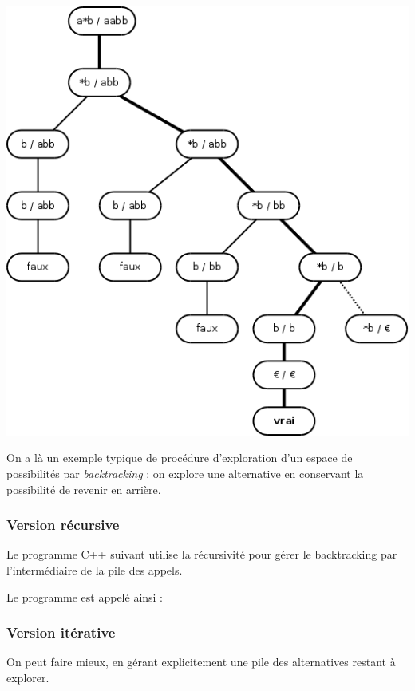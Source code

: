 \documentclass[10pt,twoside]{article}
\begin{document}
\begin{center}
\includegraphics[width=\linewidth]{../dia/arbre}
\end{center}
On a là un exemple typique de procédure d'exploration d'un espace de
possibilités par \emph{backtracking} : on explore une alternative en
conservant la possibilité de revenir en arrière.

\subsubsection{Version récursive}

Le programme C++ suivant utilise la récursivité pour gérer le
backtracking par l'intermédiaire de la pile des appels.



Le programme est appelé ainsi :


\subsubsection{Version itérative}

On peut faire mieux, en gérant explicitement une pile des alternatives restant
à explorer.
\end{document}
